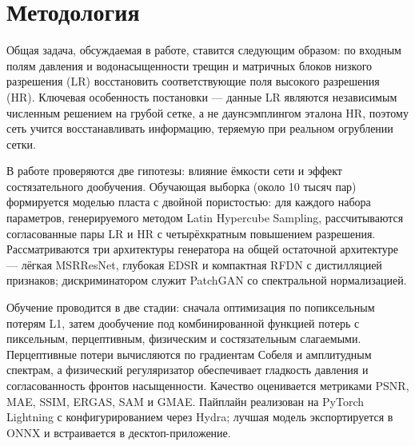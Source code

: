 \chapter{Методология}
\label{chap:methodology}

Общая задача, обсуждаемая в работе, ставится следующим образом: по входным полям давления и водонасыщенности трещин и матричных блоков низкого разрешения (LR) восстановить соответствующие поля высокого разрешения (HR). Ключевая особенность постановки — данные LR являются независимым численным решением на грубой сетке, а не даунсэмплингом эталона HR, поэтому сеть учится восстанавливать информацию, теряемую при реальном огрублении сетки.


В работе проверяются две гипотезы: влияние ёмкости сети и эффект состязательного дообучения. Обучающая выборка (около 10 тысяч пар) формируется моделью пласта с двойной пористостью: для каждого набора параметров, генерируемого методом Latin Hypercube Sampling, рассчитываются согласованные пары LR и HR с четырёхкратным повышением разрешения. Рассматриваются три архитектуры генератора на общей остаточной архитектуре — лёгкая MSRResNet, глубокая EDSR и компактная RFDN с дистилляцией признаков; дискриминатором служит PatchGAN со спектральной нормализацией.

Обучение проводится в две стадии: сначала оптимизация по попиксельным потерям L1, затем дообучение под комбинированной функцией потерь с пиксельным, перцептивным, физическим и состязательным слагаемыми. Перцептивные потери вычисляются по градиентам Собеля и амплитудным спектрам, а физический регуляризатор обеспечивает гладкость давления и согласованность фронтов насыщенности. Качество оценивается метриками PSNR, MAE, SSIM, ERGAS, SAM и GMAE. Пайплайн реализован на PyTorch Lightning с конфигурированием через Hydra; лучшая модель экспортируется в ONNX и встраивается в десктоп-приложение.